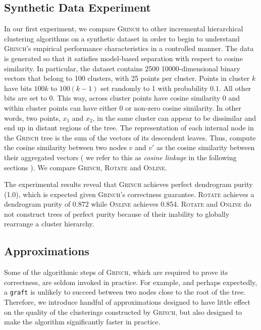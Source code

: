 \documentclass{article} \usepackage[utf8]{inputenc} \usepackage[T1]{fontenc}    \usepackage{hyperref}       \usepackage{url}            \usepackage{booktabs}       \usepackage{amsfonts}       \usepackage{nicefrac}       \usepackage{microtype}      \usepackage{geometry}
\newcommand{\alg}{\textsc{Grinch}\xspace}
\newcommand{\algrotate}{\textsc{Rotate}\xspace}
\newcommand{\greedy}{\textsc{Online}\xspace}
\newcommand{\graft}{\texttt{graft}\xspace}
\begin{document}
\subsection{Synthetic Data Experiment}
In our first experiment, we compare \alg to other incremental
hierarchical clustering algorithms on a synthetic dataset in order to
begin to understand \alg's empirical performance characteristics in a
controlled manner. The data is generated so that it satisfies
model-based separation with respect to cosine similarity. In
particular, the dataset contains 2500 10000-dimensional binary vectors
that belong to 100 clusters, with 25 points per cluster. Points in
cluster $k$ have bits $100k$ to $100(k-1)$ set randomly to 1 with
probability $0.1$. All other bits are set to 0. This way, across
cluster points have cosine similarity 0 and within cluster points can
have either 0 or non-zero cosine similarity. In other words, two
points, $x_1$ and $x_2$, in the same cluster can appear to be
dissimilar and end up in distant regions of the tree. The
representation of each internal node in the \alg tree is the sum of
the vectors of its descendent leaves. Thus, compute the cosine
similarity between two nodes $v$ and $v'$ as the cosine similarity
between their aggregated vectors (
we refer to this as \emph{cosine linkage} in the following sections
). We compare \alg, \algrotate and
\greedy.

The experimental results reveal that \alg achieves perfect dendrogram
purity (1.0), which is expected given \alg's correctness guarantee.
\algrotate achieves a dendrogram purity of 0.872 while \greedy
achieves 0.854. \algrotate and \greedy do not construct trees of
perfect purity because of their inability to globally rearrange a
cluster hierarchy.

\subsection{Approximations}
Some of the algorithmic steps of \alg, which are required to prove its
correctness, are seldom invoked in practice. For example, and perhaps
expectedly, a \graft is unlikely to succeed between two nodes close to
the root of the tree. Therefore, we introduce handful of
approximations designed to have little effect on the quality of the
clusterings constructed by \alg, but also designed to make the
algorithm significantly faster in practice.
\end{document}
